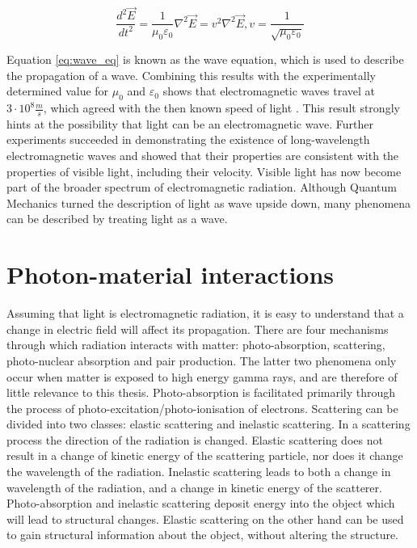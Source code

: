 \begin{equation}\label{eq:wave_eq}
\frac{d^2\vec{E}}{dt^2} = \frac{1}{\mu_0\varepsilon_0}\nabla^2 \vec{E} = v^2 \nabla^2 \vec{E},      v = \frac{1}{\sqrt{\mu_0\varepsilon_0}}
\end{equation}

Equation \ref{eq:wave_eq} is known as the wave equation, which is used to describe the propagation of a wave. Combining this results with the experimentally determined value for $\mu_0$ and $\varepsilon_0$ shows that electromagnetic waves travel at \(3\cdot 10^8 \frac{m}{s}\), which agreed with the then known speed of light \cite{Froome1971}. This result strongly hints at the possibility that light can be an electromagnetic wave. Further experiments succeeded in demonstrating the existence of long-wavelength electromagnetic waves and showed that their properties are consistent with the properties of visible light, including their velocity. Visible light has now become part of the broader spectrum of electromagnetic radiation. Although Quantum Mechanics turned the description of light as wave upside down, many phenomena can be described by treating light as a wave. 

\section{Photon-material interactions}
Assuming that light is electromagnetic radiation, it is easy to understand that a change in electric field will affect its propagation. There are four mechanisms through which radiation interacts with matter: photo-absorption, scattering, photo-nuclear absorption and pair production. The latter two phenomena only occur when matter is exposed to high energy gamma rays, and are therefore of little relevance to this thesis. Photo-absorption is facilitated primarily through the process of photo-excitation/photo-ionisation of electrons. Scattering can be divided into two classes: elastic scattering and inelastic scattering. In a scattering process the direction of the radiation is changed. Elastic scattering does not result in a change of kinetic energy of the scattering particle, nor does it change the wavelength of the radiation. Inelastic scattering leads to both a change in wavelength of the radiation, and a change in kinetic energy of the scatterer. Photo-absorption and inelastic scattering deposit energy into the object which will lead to structural changes. Elastic scattering on the other hand can be used to gain structural information about the object, without altering the structure. 

